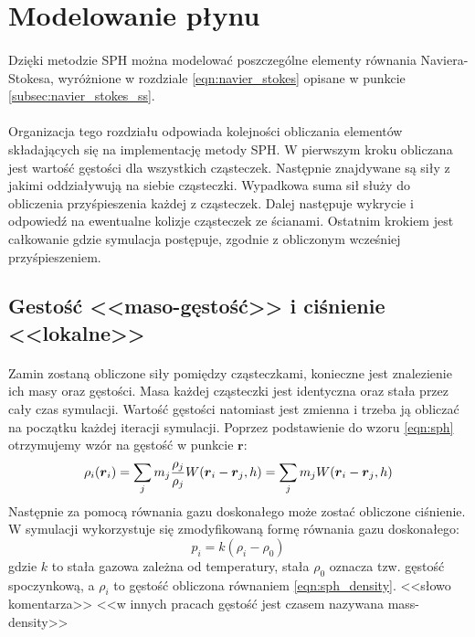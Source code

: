 \newpage

\section{Modelowanie płynu}

\paragraph{}
Dzięki metodzie SPH można modelować poszczególne elementy równania Naviera-Stokesa, wyróżnione w rozdziale \eqref{eqn:navier_stokes} opisane w punkcie \eqref{subsec:navier_stokes_ss}.
\par
\paragraph{}
\indent Organizacja tego rozdziału odpowiada kolejności obliczania elementów składających się na implementację metody SPH. W pierwszym kroku obliczana jest wartość gęstości dla wszystkich cząsteczek. Następnie znajdywane są siły z jakimi oddziaływują na siebie cząsteczki. Wypadkowa suma sił służy do obliczenia przyśpieszenia każdej z cząsteczek. Dalej następuje wykrycie i odpowiedź na ewentualne kolizje cząsteczek ze ścianami. Ostatnim krokiem jest całkowanie gdzie symulacja postępuje, zgodnie z obliczonym wcześniej przyśpieszeniem.
\par

\subsection{Gestość <<maso-gęstość>> i ciśnienie <<lokalne>>}

\paragraph{}
Zamin zostaną obliczone siły pomiędzy cząsteczkami, konieczne jest znalezienie ich masy oraz gęstości. Masa każdej cząsteczki jest identyczna oraz stała przez cały czas symulacji. Wartość gęstości natomiast jest zmienna i trzeba ją obliczać na początku każdej iteracji symulacji. Poprzez podstawienie do wzoru \eqref{eqn:sph} otrzymujemy wzór na gęstość w punkcie $\boldsymbol{r}$:
\begin{equation}
\rho_i(\boldsymbol{r}_i) = \sum\limits_{j} m_j {\rho_j \over\rho_j}W(\boldsymbol{r}_i-\boldsymbol{r}_j, h) = \sum\limits_{j} m_j W(\boldsymbol{r}_i-\boldsymbol{r}_j, h)
\label{eqn:sph_density}
\end{equation}
Następnie za pomocą równania gazu doskonałego może zostać obliczone ciśnienie. W symulacji wykorzystuje się zmodyfikowaną formę równania gazu doskonałego:
\begin{equation}
p_i = k(\rho_i - \rho_0)
\label{eqn:sph_desbrun_pressure}
\end{equation}
gdzie $k$ to stała gazowa zależna od temperatury, stała $\rho_0$ oznacza tzw. gęstość spoczynkową, a $\rho_i$ to gęstość obliczona równaniem \eqref{eqn:sph_density}. <<słowo komentarza>> <<w innych pracach gęstość jest czasem nazywana mass-density>>
\par

